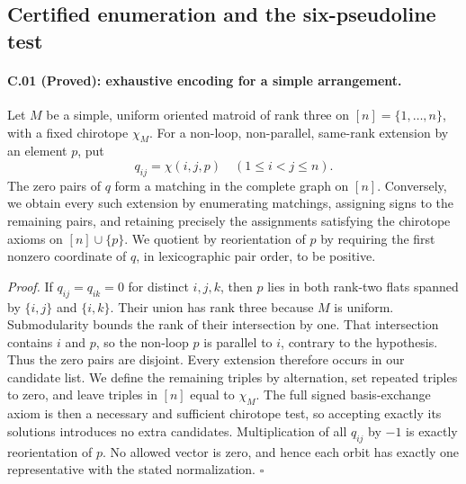 \subsection{Certified enumeration and the six-pseudoline test}
\label{sec:counts}

\paragraph{C.01 (Proved): exhaustive encoding for a simple arrangement.}
Let $M$ be a simple, uniform oriented matroid of rank three on
$[n]=\{1,\ldots,n\}$, with a fixed chirotope $\chi_M$.
For a non-loop, non-parallel, same-rank extension by an element $p$, put
\[
 q_{ij}=\chi(i,j,p)\quad (1\leq i<j\leq n).
\]
The zero pairs of $q$ form a matching in the complete graph on $[n]$.
Conversely, we obtain every such extension by enumerating matchings,
assigning signs to the remaining pairs, and retaining precisely the
assignments satisfying the chirotope axioms on $[n]\cup\{p\}$.
We quotient by reorientation of $p$ by requiring the first nonzero
coordinate of $q$, in lexicographic pair order, to be positive.

\emph{Proof.}
If $q_{ij}=q_{ik}=0$ for distinct $i,j,k$, then $p$ lies in both
rank-two flats spanned by $\{i,j\}$ and $\{i,k\}$. Their union has
rank three because $M$ is uniform. Submodularity bounds the rank of
their intersection by one. That intersection contains $i$ and $p$,
so the non-loop $p$ is parallel to $i$, contrary to the hypothesis.
Thus the zero pairs are disjoint. Every extension therefore occurs in
our candidate list. We define the remaining triples by alternation,
set repeated triples to zero, and leave triples in $[n]$ equal to
$\chi_M$. The full signed basis-exchange axiom is then a necessary
and sufficient chirotope test, so accepting exactly its solutions
introduces no extra candidates. Multiplication of all $q_{ij}$ by
$-1$ is exactly reorientation of $p$. No allowed vector is zero, and
hence each orbit has exactly one representative with the stated
normalization. \hfill$\square$

